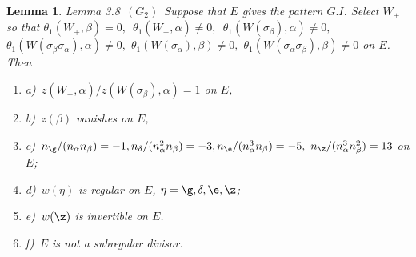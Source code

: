 \documentclass{memo-l}
\newtheorem{lemma}[theorem]{Lemma}
\theoremstyle{definition}
\theoremstyle{remark}
\numberwithin{section}{chapter}
\numberwithin{equation}{chapter}
\begin{document}
\begin{lemma}{Lemma 3.8}\  $(G_{2})$\  Suppose that $E$ gives the pattern $G.I$. 
 Select $W_{+}$ so that ${\theta}_{1}(W_{+},{\beta}) = 0,$\ ${\theta}_{1}(W_{+},
{\alpha})\ne 0,$\ ${\theta}_{1}(W({\sigma}_{\beta}),{\alpha})\ne 0,$ 
${\theta}_{1}(W({\sigma}_{\beta}{\sigma}_{\alpha}),{\alpha})\ne 0,$ 
${\theta}_{1}(W({\sigma}_{\alpha}),{\beta})\ne 0,$ 
${\theta}_{1}(W({\sigma}_{\alpha}{\sigma}_{\beta}),{\beta})\ne 0$ on $E$. 
 Then
\begin{enumerate}
\item{a)}\   $z(W_{+},{\alpha})/z(W({\sigma}_{\beta}),{\alpha}) = 1$ on $E$,
\item{b)}\   $z({\beta})$ vanishes on $E$,
\item{c)}\   $n_{{\g}}/(n_{\alpha}n_{\beta}) = -1,  
n_{{\delta}}/(n_{\alpha}^{2}n_{\beta}) = -3,  
n_{{\e}}/(n_{\alpha}^{3}n_{\beta}) =-5,$  
$n_{{\z}}/(n_{\alpha}^{3}n_{\beta}^{2}) = 13$ on $E$;
\item{d)}\   $w({\eta})$ is regular on $E$, ${\eta} = {\g},{\delta},{\e},
{\z}$;
\item{e)}\   $w({\z})$ is invertible on $E$.
\item{f)}\   $E$ is not a subregular divisor.
\end{enumerate}
\end{lemma}

\medskip
\end{document}
